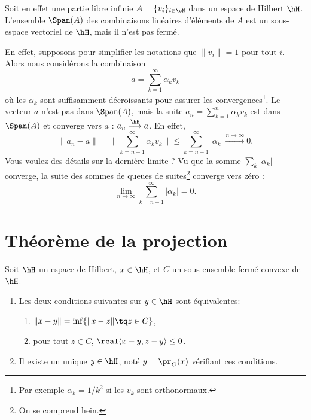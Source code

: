 Soit en effet une partie libre infinie \( A=\{ v_i \}_{i\in \eN}\) dans un espace de Hilbert \( \hH\). L'ensemble $\Span(A)$ des combinaisons linéaires d'éléments de \( A\) est un sous-espace vectoriel de \( \hH\), mais il n'est pas fermé.

En effet, supposons pour simplifier les notations que \( \| v_i \|=1\) pour tout \( i\). Alors nous considérons la combinaison
\begin{equation}
	a=\sum_{k=1}^{\infty}\alpha_kv_k
\end{equation}
où les \( \alpha_k\) sont suffisamment décroissants pour assurer les convergences\footnote{Par exemple \( \alpha_k=1/k^2\) si les \( v_k\) sont orthonormaux.}. Le vecteur \( a\) n'est pas dans \( \Span(A)\), mais la suite \( a_n=\sum_{k=1}^{n}\alpha_kv_k\) est dans \( \Span(A)\) et converge vers \( a\) : \( a_n\stackrel{\hH}{\longrightarrow}a\). En effet,
\begin{equation}
	\| a_n-a \|=\| \sum_{k=n+1}^{\infty}\alpha_kv_k \|\leq \sum_{k=n+1}^{\infty}| \alpha_k | \stackrel{n\to\infty}{\longrightarrow}0.
\end{equation}
Vous voulez des détails sur la dernière limite ? Vu que la somme \( \sum_k| \alpha_k |\) converge, la suite des sommes de queues de suites\footnote{On se comprend hein.} converge vers zéro :
\begin{equation}
	\lim_{n\to \infty} \sum_{k=n+1}^{\infty}| \alpha_k |=0.
\end{equation}

\section{Théorème de la projection}

\begin{theorem} \label{ThoProjOrthuzcYkz}
	Soit \( \hH\) un espace de Hilbert, \( x\in \hH\), et \( C\) un sous-ensemble fermé convexe de \( \hH\).
	\begin{enumerate}
		\item
		      Les deux conditions suivantes sur \( y\in \hH\) sont équivalentes:
		      \begin{enumerate}
			      \item   \label{ETsfYCSItemi}
			            \( \| x-y \|=\inf\{ \| x-z \|\tq z\in C \}\),
			      \item\label{ETsfYCSItemii}
			            pour tout \( z\in C\), \( \real\langle x-y, z-y\rangle \leq 0\).
		      \end{enumerate}
		\item
		      Il existe un unique \( y\in \hH\), noté \( y=\pr_C(x)\) vérifiant ces conditions.
	\end{enumerate}
\end{theorem}

